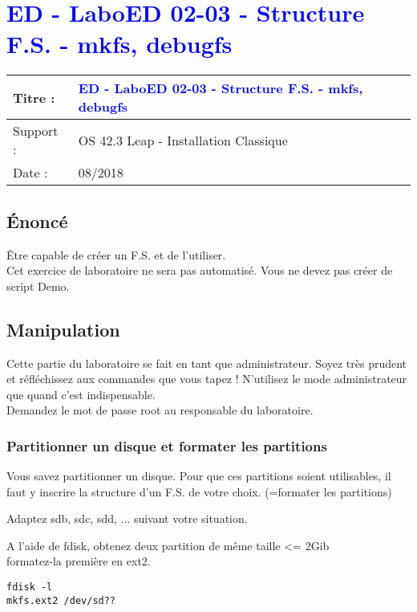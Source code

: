 \lstset{language=c}
\renewcommand{\titre}{\textcolor{blue}{ ED - LaboED 02-03 - Structure F.S. - mkfs, debugfs}}

\lhead{ \titre }
\section{{\titre} }

\begin{tabular}{|l|l|}
\hline
Titre : 	& \titre \\\hline
Support : 	& OS 42.3 Leap - Installation Classique \\\hline
Date :		& 08/2018 \\\hline
\end{tabular}

\subsection{Énoncé}

Être capable de créer un F.S. et de l'utiliser.\\
Cet exercice de laboratoire ne sera pas automatisé. Vous ne devez pas créer de script Demo.

\subsection{Manipulation}

Cette partie du laboratoire se fait en tant que administrateur. Soyez très prudent et réfléchissez aux commandes que vous tapez !
N'utilisez le mode administrateur que quand c'est indispensable.\\
Demandez le mot de passe root au responsable du laboratoire.

\subsubsection{Partitionner un disque et formater les partitions}

Vous savez partitionner un disque. Pour que ces partitions soient utilisables, il faut y inscrire la structure d'un F.S. de votre choix. (=formater les partitions)

Adaptez sdb, sdc, sdd, ... suivant votre situation.

A l'aide de fdisk, obtenez deux partition de même taille <= 2Gib\\
formatez-la première en ext2.

\begin{lstlisting}
fdisk -l
mkfs.ext2 /dev/sd??
\end{lstlisting}

